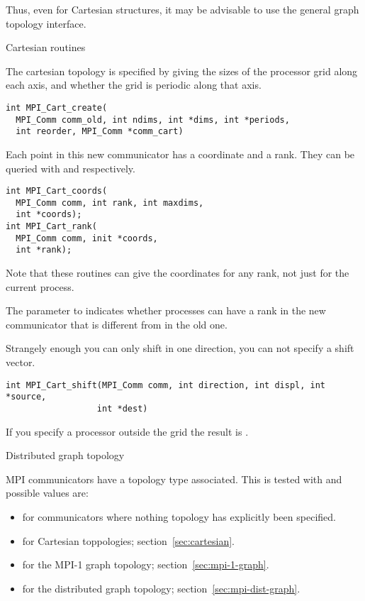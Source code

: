 Thus, even for Cartesian structures, it may be advisable to use the
general graph topology interface.

 {Cartesian routines}

The cartesian topology is specified by giving
 the sizes of the processor grid along
each axis, and whether the grid is periodic along that axis.
\begin{verbatim}
int MPI_Cart_create(
  MPI_Comm comm_old, int ndims, int *dims, int *periods, 
  int reorder, MPI_Comm *comm_cart)
\end{verbatim}
Each point in this new communicator has a coordinate and a rank.  They
can be queried with  and
 respectively.
\begin{verbatim}
int MPI_Cart_coords(
  MPI_Comm comm, int rank, int maxdims,
  int *coords);
int MPI_Cart_rank(
  MPI_Comm comm, init *coords, 
  int *rank);
\end{verbatim}
Note that these routines can give the coordinates for any rank,
not just for the current process.
%

The  parameter to 
indicates whether processes can have a rank
in the new communicator that is different from in the old one.

Strangely enough you can only shift in one direction, you can not
specify a shift vector.
\begin{verbatim}
int MPI_Cart_shift(MPI_Comm comm, int direction, int displ, int *source, 
                  int *dest)
\end{verbatim}
If you specify a processor outside the grid
the result is .


 {Distributed graph topology}
\label{sec:mpi-dist-graph}

MPI communicators have a topology type associated. This is tested with
%
%
and possible values are:
\begin{itemize}
\item {} for communicators where nothing
  topology has explicitly been specified.
\item {} for Cartesian toppologies;
  section~\ref{sec:cartesian}.
\item {} for the MPI-1 graph topology;
  section~\ref{sec:mpi-1-graph}.
\item {} for the distributed graph
  topology; section~\ref{sec:mpi-dist-graph}.
\end{itemize}

